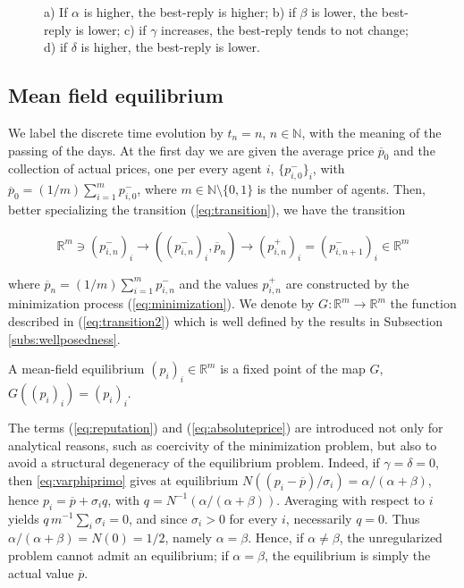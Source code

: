 \documentclass[graybox]{svmult}
\begin{document}
\begin{figure}[htbp]
    \caption{a) If $\alpha$ is higher, the best-reply is higher; b) if $\beta$ is lower, the best-reply is lower; c) if $\gamma$ increases, the best-reply tends to not change; d) if $\delta$ is higher, the best-reply is lower.}
    \label{fig:best_reply}
\end{figure}

\subsection{Mean field equilibrium}
\label{subsec:equilibrium}

We label the discrete time evolution by $t_n=n$, $n\in\mathbb{N}$, with the meaning of the passing of the days. At the first day we are given the average price $\overline p_0$ and the collection of actual prices, one per every agent $i$, $\{p_{i,0}^-\}_i$, with $\overline p_0=(1/m)\sum_{i=1}^mp_{i,0}^-$, where $m\in\mathbb{N}\setminus\{0,1\}$ is the number of agents. Then, better specializing the transition (\ref{eq:transition}), we have the transition

\begin{equation}
\label{eq:transition2}
\mathbb{R}^m \ni(p_{i,n}^-)_i\longrightarrow\left((p_{i,n}^-)_i,\overline p_n\right)\longrightarrow (p_{i,n}^+)_i=(p_{i,n+1}^-)_i\in\mathbb{R}^m
\end{equation}

\noindent
where $\overline p_n=(1/m)\sum_{i=1}^mp_{i,n}^-$ and the values $p_{i,n}^+$ are constructed by the minimization process (\ref{eq:minimization}). We denote by $G:\mathbb{R}^m\to\mathbb{R}^m$ the function described in (\ref{eq:transition2}) which is well defined by the results in Subsection \ref{subs:wellposedness}.

\begin{definition}
A mean-field equilibrium $(p_i)_i\in\mathbb{R}^m$ is a fixed point of the map $G$, $G((p_i)_i)=(p_i)_i$.
\end{definition}

\begin{remark}\label{rem:gammadeltazero}
The terms (\ref{eq:reputation}) and (\ref{eq:absoluteprice}) are introduced not only for analytical reasons, such as coercivity of the minimization problem, but also to avoid a structural degeneracy of the equilibrium problem. Indeed, if $\gamma=\delta=0$, then \eqref{eq:varphiprimo} gives at equilibrium
$N((p_i-\overline p)/\sigma_i)=\alpha/(\alpha+\beta)$, hence
$p_i=\overline p+\sigma_i q$, with $q=N^{-1}(\alpha/(\alpha+\beta))$. Averaging with respect to $i$ yields
$q\,m^{-1}\sum_i\sigma_i=0$, and since $\sigma_i>0$ for every $i$, necessarily $q=0$.
Thus $\alpha/(\alpha+\beta)=N(0)=1/2$, namely $\alpha=\beta$. Hence, if
$\alpha\neq\beta$, the unregularized problem cannot admit an equilibrium; if
$\alpha=\beta$, the equilibrium is simply the actual value $\overline p$.
\end{remark}
\end{document}
